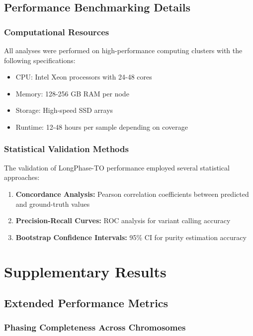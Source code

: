 \documentclass[pdflatex,sn-nature]{sn-jnl}
\begin{document}
\subsection{Performance Benchmarking Details}

\subsubsection{Computational Resources}

All analyses were performed on high-performance computing clusters with the following specifications:
\begin{itemize}
\item CPU: Intel Xeon processors with 24-48 cores
\item Memory: 128-256 GB RAM per node
\item Storage: High-speed SSD arrays
\item Runtime: 12-48 hours per sample depending on coverage
\end{itemize}

\subsubsection{Statistical Validation Methods}

The validation of LongPhase-TO performance employed several statistical approaches:

\begin{enumerate}
\item \textbf{Concordance Analysis:} Pearson correlation coefficients between predicted and ground-truth values
\item \textbf{Precision-Recall Curves:} ROC analysis for variant calling accuracy
\item \textbf{Bootstrap Confidence Intervals:} 95\% CI for purity estimation accuracy
\end{enumerate}

\section{Supplementary Results}

\subsection{Extended Performance Metrics}

\subsubsection{Phasing Completeness Across Chromosomes}
\end{document}
